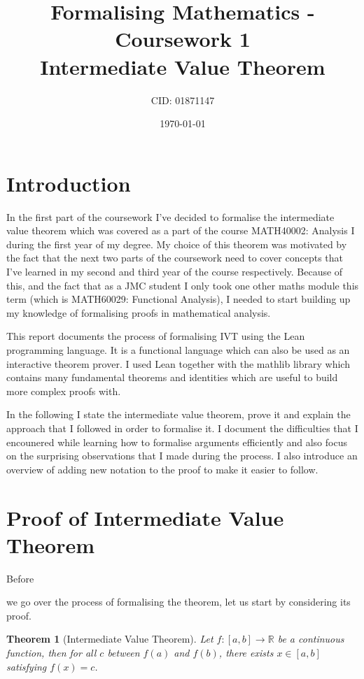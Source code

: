 \documentclass[11pt]{article}
\newcommand\R{\mathbb{R}}
\newtheorem*{theorem}{Theorem}
\begin{document}
\title{Formalising Mathematics - Coursework 1 \\ Intermediate Value Theorem}
\date{\today}
\author{CID: 01871147}
\maketitle

\section*{ Introduction }

In the first part of the coursework I've decided to formalise the intermediate
value theorem which was covered as a part of the course MATH40002: Analysis I
during the first year of my degree. My choice of this theorem was motivated by
the fact that the next two parts of the coursework need to cover concepts that
I've learned in my second and third year of the course respectively. Because of
this, and the fact that as a JMC student I only took one other maths module this
term (which is MATH60029: Functional Analysis), I needed to start building up my
knowledge of formalising proofs in mathematical analysis.

This report documents the process of formalising IVT using the Lean programming
language. It is a functional language which can also be used as an interactive
theorem prover. I used Lean together with the mathlib library which contains many
fundamental theorems and identities which are useful to build more complex proofs
with.

In the following I state the intermediate value theorem, prove it and
explain the approach that I followed in order to formalise it. I document the
difficulties that I encounered while learning how to formalise arguments
efficiently and also focus on the surprising observations that I made during the process.
I also introduce an overview of adding new notation to the proof to make it
easier to follow.


\section*{ Proof of Intermediate Value Theorem }

\hypertarget{statement}{Before} we go over the process of formalising the theorem, let us start by
considering its proof.
\begin{theorem}[Intermediate Value Theorem]
  Let $f : [a, b] \to \R  $ be a continuous function, then for all $c$ between
  $f(a)$ and $f(b)$, there exists $x \in [a, b] $ satisfying $f(x) = c$.
\end{theorem}
\end{document}
